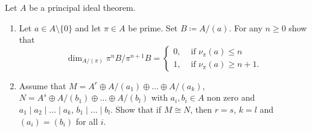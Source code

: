 \documentclass[a4paper,11pt]{article}
\begin{document}
Let $A$ be a principal ideal theorem.
\begin{enumerate}
    \item Let $a \in A\setminus \{0\}$ and let $\pi \in A$ be prime. Set 
        $B \coloneqq A/(a)$. For any $n \geq 0$ show that 
        \begin{equation*}
            \dim_{A/(\pi)} \pi^n B/\pi^{n+1}B = \begin{cases}
                0, &\text{ if }\nu_\pi(a) \leq n\\
                1, &\text{ if }\nu_\pi(a) \geq n+1.
            \end{cases}
        \end{equation*}
    \item Assume that $M = A^r \oplus A/(a_1) \oplus \dots \oplus A/(a_k)$,
        $N = A^s \oplus A/(b_1) \oplus \dots \oplus A/(b_l)$ with 
        $a_i, b_i \in A$ non zero and $a_1 \mid a_2 \mid \dots \mid a_k$,
        $b_1 \mid \dots \mid b_l$. Show that if $M \cong N$, then $r=s$, 
        $k = l$ and $(a_i) = (b_i)$ for all $i$. 
\end{enumerate}
\end{document}
